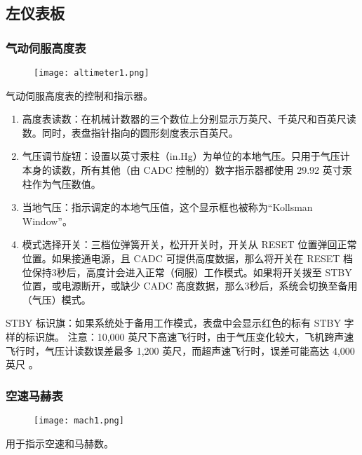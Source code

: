 \subsection{左仪表板}

\subsubsection{气动伺服高度表}
\begin{figure}[htb]
	\centering
	\texttt{[image: altimeter1.png]}
\end{figure}
气动伺服高度表的控制和指示器。

\begin{enumerate}
	\item 高度表读数：在机械计数器的三个数位上分别显示万英尺、千英尺和百英尺读数。同时，表盘指针指向的圆形刻度表示百英尺。
	\item 气压调节旋钮：设置以英寸汞柱（in.Hg）为单位的本地气压。只用于气压计本身的读数，所有其他（由 CADC 控制的）数字指示器都使用 29.92 英寸汞柱作为气压数值。
	\item 当地气压：指示调定的本地气压值，这个显示框也被称为“Kollsman Window”。
	\item 模式选择开关：三档位弹簧开关，松开开关时，开关从 RESET 位置弹回正常位置。如果接通电源，且 CADC 可提供高度数据，那么将开关在 RESET 档位保持3秒后，高度计会进入正常（伺服）工作模式。如果将开关拨至 STBY 位置，或电源断开，或缺少 CADC 高度数据，那么3秒后，系统会切换至备用（气压）模式。
\end{enumerate}

STBY 标识旗：如果系统处于备用工作模式，表盘中会显示红色的标有 STBY 字样的标识旗。
注意：10,000 英尺下高速飞行时，由于气压变化较大，飞机跨声速飞行时，气压计读数误差最多 1,200 英尺，而超声速飞行时，误差可能高达 4,000 英尺 。

\subsubsection{空速马赫表}
\begin{figure}[htb]
	\centering
	\texttt{[image: mach1.png]}
\end{figure}
用于指示空速和马赫数。

